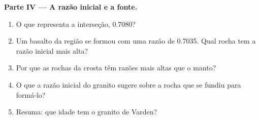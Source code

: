 \begin{problem}
\medskip
\noindent\textbf{Parte IV --- A razão inicial e a fonte.}
\begin{enumerate}[resume]
  \item O que representa a interseção, 0.7080?
  \item Um basalto da região se formou com uma razão de 0.7035. Qual rocha
        tem a razão inicial mais alta?
  \item Por que as rochas da crosta têm razões mais altas que o manto?
  \item O que a razão inicial do granito sugere sobre a rocha que se fundiu
        para formá-lo?
  \item Resuma: que idade tem o granito de Varden?
\end{enumerate}
\end{problem}
